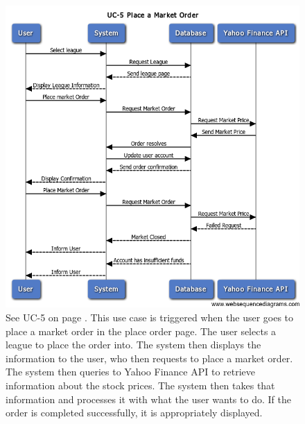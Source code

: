 \begin{figure}
\centering
\includegraphics[width=5.5in]{./img/uc5.png}
\caption{See UC-5 on page \pageref{UC-5}. This use case is triggered when the
user goes to place a market order in the place
order page. The user selects a league to place the order into. The system then
displays the information to the user, who then requests to place a market order.
The system then queries to Yahoo Finance API to retrieve information about the
stock prices. The system then takes that information and processes it with what
the user wants to do. If the order is completed successfully, it is appropriately
displayed.}
\end{figure}


